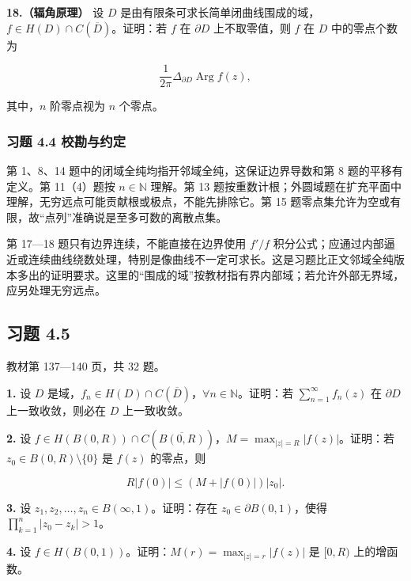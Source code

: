 \documentclass[11pt,a4paper]{article}
\begin{document}
\textbf{18.（辐角原理）} 设 \(D\)
是由有限条可求长简单闭曲线围成的域，\(f\in H(D)\cap C(\overline D)\)。证明：若
\(f\) 在 \(\partial D\) 上不取零值，则 \(f\) 在 \(D\) 中的零点个数为

\[
\frac1{2\pi}\Delta_{\partial D}\operatorname{Arg}f(z),
\]

其中，\(n\) 阶零点视为 \(n\) 个零点。

\subsubsection{习题 4.4
校勘与约定}\label{ch04-practice-ux4e60ux9898-44-ux6821ux52d8ux4e0eux7ea6ux5b9a}

第 1、8、14 题中的闭域全纯均指开邻域全纯，这保证边界导数和第 8
题的平移有定义。第 11（4）题按 \(n\in\mathbb N\) 理解。第 13
题按重数计根；外圆域题在扩充平面中理解，无穷远点可能贡献根或极点，不能先排除它。第
15 题零点集允许为空或有限，故``点列''准确说是至多可数的离散点集。

第 17---18 题只有边界连续，不能直接在边界使用 \(f'/f\)
积分公式；应通过内部逼近或连续曲线绕数处理，特别是像曲线不一定可求长。这是习题比正文邻域全纯版本多出的证明要求。这里的``围成的域''按教材指有界内部域；若允许外部无界域，应另处理无穷远点。

\subsection{习题 4.5}\label{ch04-practice-heading-5}

教材第 137---140 页，共 32 题。

\par{}
\noindent\textbf{1.} 设 \(D\)
是域，\(f_n\in H(D)\cap C(\overline D)\)，\(\forall n\in\mathbb N\)。证明：若
\(\sum_{n=1}^{\infty}f_n(z)\) 在 \(\partial D\) 上一致收敛，则必在 \(D\)
上一致收敛。

\par{}
\noindent\textbf{2.} 设
\(f\in H(B(0,R))\cap C(\overline{B(0,R)})\)，\(M=\max_{|z|=R}|f(z)|\)。证明：若
\(z_0\in B(0,R)\setminus\{0\}\) 是 \(f(z)\) 的零点，则

\[
R|f(0)|\le(M+|f(0)|)|z_0|.
\]

\par{}
\noindent\textbf{3.} 设 \(z_1,z_2,\ldots,z_n\in B(\infty,1)\)。证明：存在
\(z_0\in\partial B(0,1)\)，使得 \(\prod_{k=1}^n|z_0-z_k|>1\)。

\par{}
\noindent\textbf{4.} 设 \(f\in H(B(0,1))\)。证明：\(M(r)=\max_{|z|=r}|f(z)|\) 是
\([0,R)\) 上的增函数。
\end{document}
